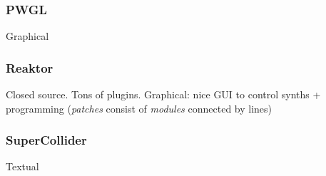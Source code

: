 \documentclass{article}
\begin{document}
\subsubsection{PWGL}
\cite{pwgl}
Graphical

\subsubsection{Reaktor}
\cite{reaktor} Closed source. Tons of plugins. Graphical: nice GUI to control
synths + programming (\emph{patches} consist of \emph{modules} connected by
lines)

\subsubsection{SuperCollider}
\cite{supercollider}
Textual




\end{document}
